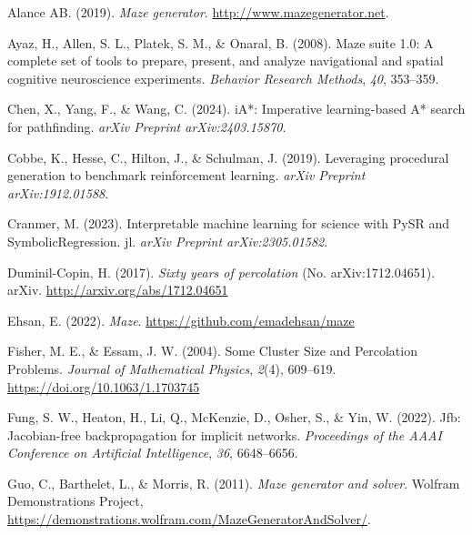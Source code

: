 \documentclass[10pt,a4paper,onecolumn]{article}
\newlength{\cslhangindent}
\newenvironment{CSLReferences}[2] %
 {\begin{list}{}{%
  \setlength{\itemindent}{0pt}
  \setlength{\leftmargin}{0pt}
  \setlength{\parsep}{0pt}
  \ifodd #1
   \setlength{\leftmargin}{\cslhangindent}
   \setlength{\itemindent}{-1\cslhangindent}
  \fi
  \setlength{\itemsep}{#2\baselineskip}}}
 {\end{list}}
\begin{document}
\hypertarget{refs}{}
\begin{CSLReferences}{1}{0.5}
\leavevmode{}%
Alance AB. (2019). \emph{Maze generator}.
\url{http://www.mazegenerator.net}.

\leavevmode{}%
Ayaz, H., Allen, S. L., Platek, S. M., \& Onaral, B. (2008). Maze suite
1.0: A complete set of tools to prepare, present, and analyze
navigational and spatial cognitive neuroscience experiments.
\emph{Behavior Research Methods}, \emph{40}, 353--359.

\leavevmode{}%
Chen, X., Yang, F., \& Wang, C. (2024). {iA*}: Imperative learning-based
{A*} search for pathfinding. \emph{arXiv Preprint arXiv:2403.15870}.

\leavevmode{}%
Cobbe, K., Hesse, C., Hilton, J., \& Schulman, J. (2019). Leveraging
procedural generation to benchmark reinforcement learning. \emph{arXiv
Preprint arXiv:1912.01588}.

\leavevmode{}%
Cranmer, M. (2023). Interpretable machine learning for science with PySR
and SymbolicRegression. jl. \emph{arXiv Preprint arXiv:2305.01582}.

\leavevmode{}%
Duminil-Copin, H. (2017). \emph{Sixty years of percolation} (No.
arXiv:1712.04651). {arXiv}. \url{http://arxiv.org/abs/1712.04651}

\leavevmode{}%
Ehsan, E. (2022). \emph{Maze}. \url{https://github.com/emadehsan/maze}

\leavevmode{}%
Fisher, M. E., \& Essam, J. W. (2004). Some {Cluster Size} and
{Percolation Problems}. \emph{Journal of Mathematical Physics},
\emph{2}(4), 609--619. \url{https://doi.org/10.1063/1.1703745}

\leavevmode{}%
Fung, S. W., Heaton, H., Li, Q., McKenzie, D., Osher, S., \& Yin, W.
(2022). Jfb: Jacobian-free backpropagation for implicit networks.
\emph{Proceedings of the AAAI Conference on Artificial Intelligence},
\emph{36}, 6648--6656.

\leavevmode{}%
Guo, C., Barthelet, L., \& Morris, R. (2011). \emph{Maze generator and
solver}. Wolfram Demonstrations Project,
\url{https://demonstrations.wolfram.com/MazeGeneratorAndSolver/}.


\end{CSLReferences}
\end{document}

